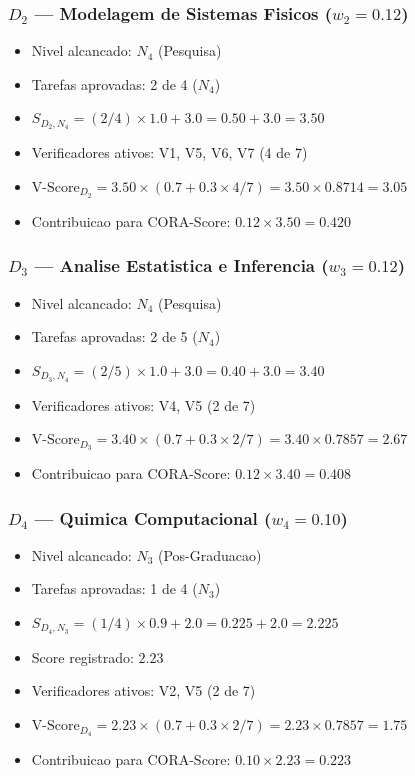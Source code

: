 \subsubsection{$D_2$ --- Modelagem de Sistemas Fisicos ($w_{2}=0.12$)}

\begin{itemize}
\item Nivel alcancado: $N_4$ (Pesquisa)
\item Tarefas aprovadas: 2 de 4 ($N_4$)
\item $S_{D_2,N_4} = (2/4) \times 1.0 + 3.0 = 0.50 + 3.0 = 3.50$
\item Verificadores ativos: V1, V5, V6, V7 (4 de 7)
\item $\text{V-Score}_{D_2} = 3.50 \times (0.7 + 0.3 \times 4/7) = 3.50 \times 0.8714 = 3.05$
\item Contribuicao para CORA-Score: $0.12 \times 3.50 = 0.420$
\end{itemize}

\subsubsection{$D_3$ --- Analise Estatistica e Inferencia ($w_{3}=0.12$)}

\begin{itemize}
\item Nivel alcancado: $N_4$ (Pesquisa)
\item Tarefas aprovadas: 2 de 5 ($N_4$)
\item $S_{D_3,N_4} = (2/5) \times 1.0 + 3.0 = 0.40 + 3.0 = 3.40$
\item Verificadores ativos: V4, V5 (2 de 7)
\item $\text{V-Score}_{D_3} = 3.40 \times (0.7 + 0.3 \times 2/7) = 3.40 \times 0.7857 = 2.67$
\item Contribuicao para CORA-Score: $0.12 \times 3.40 = 0.408$
\end{itemize}

\subsubsection{$D_4$ --- Quimica Computacional ($w_{4}=0.10$)}

\begin{itemize}
\item Nivel alcancado: $N_3$ (Pos-Graduacao)
\item Tarefas aprovadas: 1 de 4 ($N_3$)
\item $S_{D_4,N_3} = (1/4) \times 0.9 + 2.0 = 0.225 + 2.0 = 2.225$
\item Score registrado: $2.23$
\item Verificadores ativos: V2, V5 (2 de 7)
\item $\text{V-Score}_{D_4} = 2.23 \times (0.7 + 0.3 \times 2/7) = 2.23 \times 0.7857 = 1.75$
\item Contribuicao para CORA-Score: $0.10 \times 2.23 = 0.223$
\end{itemize}

